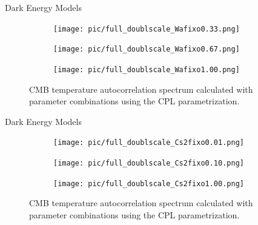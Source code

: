 \documentclass[serif, aspectratio=169]{beamer}
\begin{document}
\begin{frame}{Dark Energy Models}

    \begin{figure}
        \centering
        \begin{subfigure}[b]{0.32\linewidth}
            \texttt{[image: pic/full\_doublscale\_Wafixo0.33.png]}
            \label{fig:DE_wa033}
        \end{subfigure}
        \hfill
        \begin{subfigure}[b]{0.32\linewidth}
            \texttt{[image: pic/full\_doublscale\_Wafixo0.67.png]}
            \label{fig:DE_wa067}
        \end{subfigure}
        \hfill
        \begin{subfigure}[b]{0.32\linewidth}
            \texttt{[image: pic/full\_doublscale\_Wafixo1.00.png]}
            \label{fig:DE_wa1}
        \end{subfigure}
    \caption{CMB temperature autocorrelation spectrum calculated with parameter combinations using the CPL parametrization.}
    \label{fig:DE_wa_fixo}
    \end{figure}

\end{frame}

\begin{frame}{Dark Energy Models}

    \begin{figure}
        \centering
        \begin{subfigure}[b]{0.32\linewidth}
            \texttt{[image: pic/full\_doublscale\_Cs2fixo0.01.png]}
            \label{fig:DE_cs001}
        \end{subfigure}
        \hfill
        \begin{subfigure}[b]{0.32\linewidth}
            \texttt{[image: pic/full\_doublscale\_Cs2fixo0.10.png]}
            \label{fig:DE_cs01}
        \end{subfigure}
        \hfill
        \begin{subfigure}[b]{0.32\linewidth}
            \texttt{[image: pic/full\_doublscale\_Cs2fixo1.00.png]}
            \label{fig:DE_cs1}
        \end{subfigure}
    \caption{CMB temperature autocorrelation spectrum calculated with parameter combinations using the CPL parametrization.}
    \label{fig:DE_cs_fixo}
    \end{figure}

\end{frame}
\end{document}
